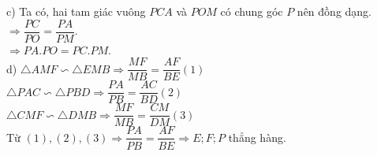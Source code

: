 \begin{ex}
{             c) Ta có, hai tam giác vuông $PCA$ và $POM$ có chung góc $P$ nên đồng dạng.\\
             $\Rightarrow \dfrac{PC}{PO}=\dfrac{PA}{PM}.$\\
             $\Rightarrow PA.PO=PC.PM$.\\
             d) $\triangle{AMF}\backsim\triangle{EMB} \Rightarrow\dfrac{MF}{MB}=\dfrac{AF}{BE} (1)$\\
             $\triangle{PAC}\backsim\triangle{PBD} \Rightarrow\dfrac{PA}{PB}=\dfrac{AC}{BD} (2)$\\
             $\triangle{CMF}\backsim\triangle{DMB} \Rightarrow\dfrac{MF}{MB}=\dfrac{CM}{DM} (3)$\\ 
             Từ $(1), (2), (3) \Rightarrow \dfrac{PA}{PB}=\dfrac{AF}{BE}\Rightarrow E;F;P$ thẳng hàng. 
             }             
\end{ex}
